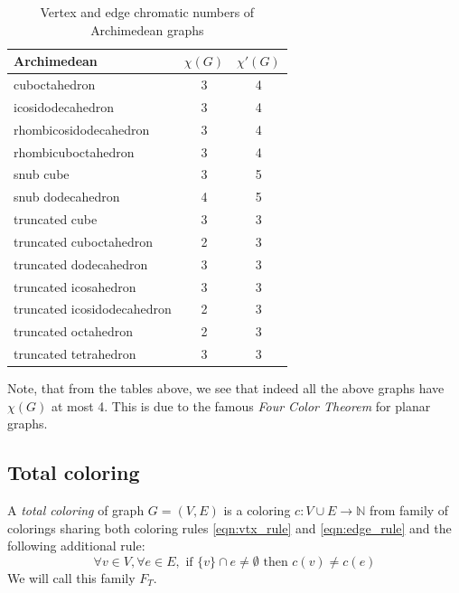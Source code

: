 \begin{table}[H]
    \centering
    \label{tab:archimedean-chrom-nums}
    \begin{tabular}{|l|c|c|}
    \hline
    Archimedean & $\chi(G)$ & $\chi'(G)$ \\
    \hline\hline
    cuboctahedron & 3 & 4 \\
    \hline
    icosidodecahedron & 3 & 4 \\
    \hline
    rhombicosidodecahedron & 3 & 4 \\
    \hline
    rhombicuboctahedron & 3 & 4 \\
    \hline
    snub cube & 3 & 5 \\
    \hline
    snub dodecahedron & 4 & 5 \\
    \hline
    truncated cube & 3 & 3 \\
    \hline
    truncated cuboctahedron & 2 & 3 \\
    \hline
    truncated dodecahedron & 3 & 3 \\
    \hline
    truncated icosahedron & 3 & 3 \\
    \hline
    truncated icosidodecahedron & 2 & 3 \\
    \hline
    truncated octahedron & 2 & 3 \\
    \hline
    truncated tetrahedron & 3 & 3 \\
    \hline
    \end{tabular}
    \caption{Vertex and edge chromatic numbers of Archimedean graphs}
\end{table}

Note, that from the tables above, we see that indeed all the above graphs have $\chi(G)$ at most 4. This is due to the famous \textit{Four Color Theorem} \cite{appelhaken76} for planar graphs.

\subsection{Total coloring}

\begin{definition}
    A \textit{total coloring} of graph $G=(V,E)$ is a coloring $c: V \cup E \rightarrow \mathbb{N}$ from family of colorings sharing both coloring rules \ref{eqn:vtx_rule} and \ref{eqn:edge_rule} and the following additional rule: 
    \begin{equation}\label{eqn:tot_rule}
    \forall v \in V,  \forall e \in E, \text{ if } \{v\} \cap e \neq \emptyset \text{ then } c(v) \neq c(e) \tag{$R_T$}
    \end{equation}
    We will call this family $F_T$.
\end{definition}


